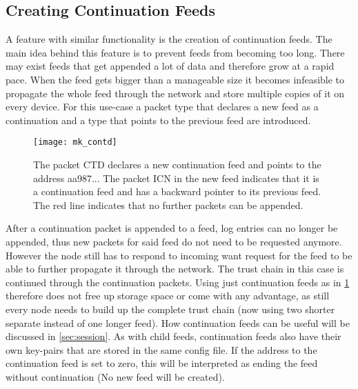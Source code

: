 \subsection{Creating Continuation Feeds}
A feature with similar functionality is the creation of continuation feeds. The main idea behind this feature is to prevent feeds from becoming too long. There may exist feeds that get appended a lot of data and therefore grow at a rapid pace. When the feed gets bigger than a manageable size it becomes infeasible to propagate the whole feed through the network and store multiple copies of it on every device. For this use-case a packet type that declares a new feed as a continuation and a type that points to the previous feed are introduced.

\begin{figure}
\centering
\texttt{[image: mk\_contd]}
\caption{The packet CTD declares a new continuation feed and points to the address aa987... The packet ICN in the new feed indicates that it is a continuation feed and has a backward pointer to its previous feed. The red line indicates that no further packets can be appended.}
\label{fig:mk_contd}
\end{figure}

After a continuation packet is appended to a feed, log entries can no longer be appended, thus new packets for said feed do not need to be requested anymore. However the node still has to respond to incoming want request for the feed to be able to further propagate it through the network. The trust chain in this case is continued through the continuation packets. Using just continuation feeds as in \cref{fig:mk_contd} therefore does not free up storage space or come with any advantage, as still every node needs to build up the complete trust chain (now using two shorter separate instead of one longer feed). How continuation feeds can be useful will be discussed in \cref{sec:session}. As with child feeds, continuation feeds also have their own key-pairs that are stored in the same config file. If the address to the continuation feed is set to zero, this will be interpreted as ending the feed without continuation (No new feed will be created).






